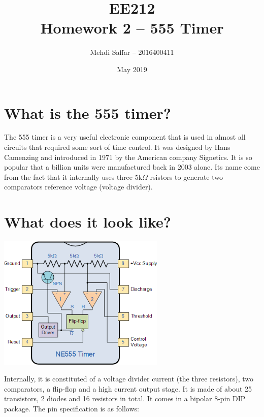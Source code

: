 \documentclass[12pt]{extarticle}
\title{EE212 \\ Homework 2 --  555 Timer}
\author{Mehdi Saffar -- 2016400411}
\date{May 2019}
\begin{document}
\maketitle
\section{What is the 555 timer?}
The 555 timer is a very useful electronic component that is used in almost all circuits that required some sort of time control. It was designed by Hans Camenzing and introduced in 1971 by the American company Signetics. It is so popular that a billion units were manufactured back in 2003 alone. Its name come from the fact that it internally uses three 5k$\Omega$ rsistors to generate two comparators reference voltage (voltage divider).

\section{What does it look like?}
\begin{center}
\includegraphics[width=8cm]{form.png}
\end{center}
Internally, it is constituted of a voltage divider current (the three resistors), two comparators, a flip-flop and a high current output stage. It is made of about 25 transistors, 2 diodes and 16 resistors in total. It comes in a bipolar 8-pin DIP package. The pin specification is as follows:
\end{document}
